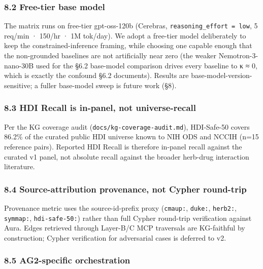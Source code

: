 \documentclass[
]{article}
\begin{document}
\hypertarget{free-tier-base-model}{%
\subsubsection{8.2 Free-tier base model}\label{free-tier-base-model}}

The matrix runs on free-tier gpt-oss-120b (Cerebras,
\texttt{reasoning\_effort\ =\ low}, 5 req/min · 150/hr · 1M tok/day). We
adopt a free-tier model deliberately to keep the constrained-inference
framing, while choosing one capable enough that the non-grounded
baselines are not artificially near zero (the weaker Nemotron-3-nano-30B
used for the §6.2 base-model comparison drives every baseline to κ ≈ 0,
which is exactly the confound §6.2 documents). Results are
base-model-version-sensitive; a fuller base-model sweep is future work
(§8).

\hypertarget{hdi-recall-is-in-panel-not-universe-recall}{%
\subsubsection{8.3 HDI Recall is in-panel, not
universe-recall}\label{hdi-recall-is-in-panel-not-universe-recall}}

Per the KG coverage audit (\texttt{docs/kg-coverage-audit.md}),
HDI-Safe-50 covers 86.2\% of the curated public HDI universe known to
NIH ODS and NCCIH (n=15 reference pairs). Reported HDI Recall is
therefore in-panel recall against the curated v1 panel, not absolute
recall against the broader herb-drug interaction literature.

\hypertarget{source-attribution-provenance-not-cypher-round-trip}{%
\subsubsection{8.4 Source-attribution provenance, not Cypher
round-trip}\label{source-attribution-provenance-not-cypher-round-trip}}

Provenance metric uses the source-id-prefix proxy (\texttt{cmaup:},
\texttt{duke:}, \texttt{herb2:}, \texttt{symmap:},
\texttt{hdi-safe-50:}) rather than full Cypher round-trip verification
against Aura. Edges retrieved through Layer-B/C MCP traversals are
KG-faithful by construction; Cypher verification for adversarial cases
is deferred to v2.

\hypertarget{ag2-specific-orchestration}{%
\subsubsection{8.5 AG2-specific
orchestration}\label{ag2-specific-orchestration}}
\end{document}
